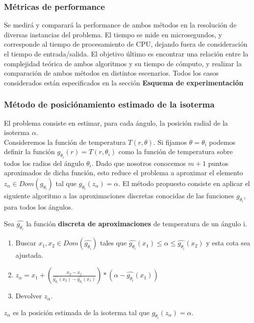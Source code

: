 \subsubsection{Métricas de performance}

Se medir\'a y comparar\'a la performance de ambos m\'etodos en la resoluci\'on de diversas instancias del problema. El tiempo se mide en microsegundos, y corresponde al tiempo de procesamiento de CPU, dejando fuera de consideraci\'on el tiempo de entrada/salida. El objetivo \'ultimo es encontrar una relaci\'on entre la complejidad te\'orica de ambos algoritmos y su tiempo de c\'omputo, y realizar la comparaci\'on de ambos m\'etodos en distintos escenarios. Todos los casos considerados est\'an especificados en la secci\'on \textbf{Esquema de experimentaci\'on}

\subsubsection{Método de posiciónamiento estimado de la isoterma}
El problema consiste en estimar, para cada ángulo, la posición radial de la isoterma \texttt{$\alpha$}.\\
Consideremos la función de temperatura $T(r,\theta)$. Si fijamos $\theta = \theta_i$ podemos definir la función $g_{\theta_i}(r) = T(r,\theta_i)$ como la función de temperatura sobre todos los radios del ángulo $\theta_i$. Dado que nosotros conocemos $m+1$ puntos aproximados de dicha función, esto reduce el problema a aproximar el elemento $ z_\alpha \in Dom(g_{\theta_i}) $ tal que $g_{\theta_i}(z_\alpha) = \alpha$. El método propuesto consiste en aplicar el siguiente algoritmo a las aproximaciones discretas conocidas de las funciones $g_{\theta_i}$, para todos los ángulos.
\begin{theorem}
    Sea $\hat{g_{\theta_i}}$ la función \textbf{discreta de aproximaciones} de temperatura de un ángulo i.
    \begin{enumerate}
        \item Buscar $ x_1, x_2 \in Dom(\hat{g_{\theta_i}}) $ tales que $ \hat{g_{\theta_i}}(x_1) \leq \alpha \leq \hat{g_{\theta_i}}(x_2)$ y esta cota sea ajustada.
        
        \item $z_\alpha = x_1 + \left(\frac{x_2 - x_1}{\hat{g_{\theta_i}}(x_2) - \hat{g_{\theta_i}}(x_1)}\right) * (\alpha - \hat{g_{\theta_i}}(x_1))$

        \item Devolver $z_\alpha$.
    \end{enumerate}
    $z_\alpha$ es la posición estimada de la isoterma tal que $g_{\theta_i}(z_\alpha) = \alpha$.
\end{theorem}

